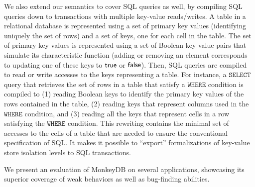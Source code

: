 We also extend our semantics to cover SQL queries as well, by compiling SQL queries down to transactions with multiple key-value reads/writes. A table in a relational database is represented using a set of primary key values (identifying uniquely the set of rows) and a set of keys, one for each cell in the table. The set of primary key values is represented using a set of Boolean key-value pairs that simulate its characteristic function (adding or removing an element corresponds to updating one of these keys to $\mathsf{true}$ or $\mathsf{false}$). Then, SQL queries are compiled to read or write accesses to the keys representing a table. For instance, a $\mathtt{SELECT}$ query that retrieves the set of rows in a table that satisfy a $\mathtt{WHERE}$ condition is compiled to (1) reading Boolean keys to identify the primary key values of the rows contained in the table, (2) reading keys that represent columns used in the $\mathtt{WHERE}$ condition, and (3) reading all the keys that represent cells in a row satisfying the $\mathtt{WHERE}$ condition. This rewriting contains the minimal set of accesses to the cells of a table that are needed to ensure the conventional specification of SQL.
It makes it possible to ``export'' formalizations of key-value store isolation levels to SQL transactions.

We present an evaluation of MonkeyDB on several applications, showcasing its superior coverage of weak behaviors as well as bug-finding abilities.

